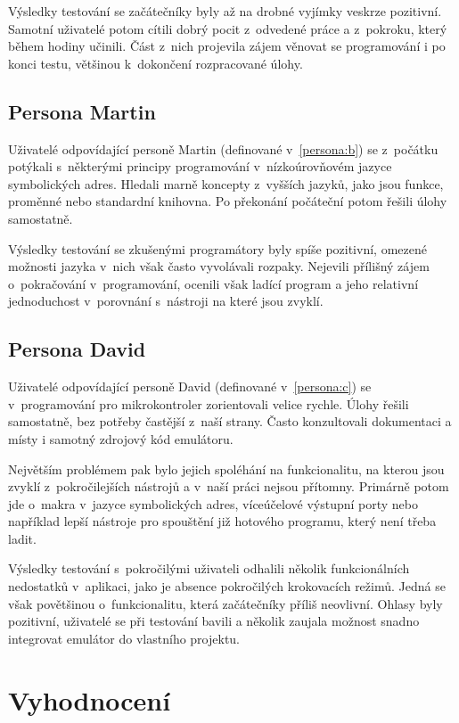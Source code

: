 Výsledky testování se začátečníky byly až na drobné vyjímky veskrze pozitivní. Samotní uživatelé potom cítili dobrý pocit z~odvedené práce a z~pokroku, který během hodiny učinili. Část z~nich projevila zájem věnovat se programování i po konci testu, většinou k~dokončení rozpracované úlohy.

\subsection{Persona Martin}

Uživatelé odpovídající personě Martin (definované v~\ref{persona:b}) se z~počátku po\-tý\-ka\-li s~některými principy programování v~nízkoúrovňovém jazyce symbolických adres. Hledali marně koncepty z~vyšších jazyků, jako jsou funkce, proměnné nebo standardní knihovna. Po překonání počáteční  potom řešili úlohy samostatně.

Výsledky testování se zkušenými programátory byly spíše pozitivní, omezené možnosti jazyka v~nich však často vyvolávali rozpaky. Nejevili přílišný zájem o~pokračování v~programování, ocenili však ladící program a jeho relativní jednoduchost v~porovnání s~nástroji na které jsou zvyklí.

\subsection{Persona David}

Uživatelé odpovídající personě David (definované v~\ref{persona:c}) se v~programování pro mikrokontroler zorientovali velice rychle. Úlohy řešili samostatně, bez potřeby častější z~naší strany. Často konzultovali dokumentaci a místy i samotný zdrojový kód emulátoru.

Největším problémem pak bylo jejich spoléhání na funkcionalitu, na kterou jsou zvyklí z~pokročilejších nástrojů a v~naší práci nejsou přítomny. Primárně potom jde o~makra v~jazyce symbolických adres, víceúčelové výstupní porty nebo například lepší nástroje pro spouštění již hotového programu, který není třeba ladit.

Výsledky testování s~pokročilými uživateli odhalili několik funkcionálních nedostatků v~aplikaci, jako je absence pokročilých krokovacích režimů. Jedná se však povětšinou o~funkcionalitu, která začátečníky příliš neovlivní. Ohlasy byly pozitivní, uživatelé se při testování bavili a několik zaujala možnost snadno integrovat emulátor do vlastního projektu.

\section{Vyhodnocení}

